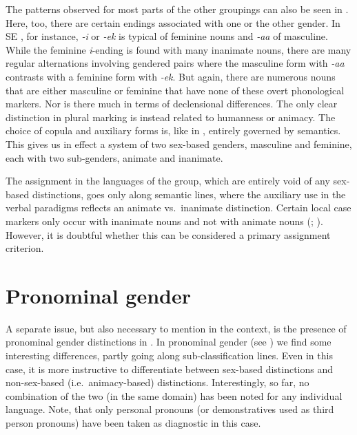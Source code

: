 \documentclass[output=collectionpaper]{langsci/langscibook}
\begin{document}
The patterns observed for most parts of the other groupings can also be seen in . Here, too, there are certain endings associated with one or the other gender. In SE , for instance, \textit{{}-i} or \textit{\nobreakdash-ek} is typical of feminine nouns and \textit{\nobreakdash-aa} of masculine. While the feminine \textit{i}{}-ending is found with many inanimate nouns, there are many regular alternations involving gendered pairs where the masculine form with \textit{\nobreakdash-aa} contrasts with a feminine form with \textit{\nobreakdash-ek}. But again, there are numerous nouns that are either masculine or feminine that have none of these overt phonological markers. Nor is there much in terms of declensional differences. The only clear distinction in plural marking is instead related to humanness or animacy. The choice of copula and auxiliary forms is, like in , entirely governed by semantics. This gives us in effect a system of two sex-based genders, masculine and feminine, each with two sub-genders, animate and inanimate.

\largerpage[-1]
The assignment in the languages of the  group, which are entirely void of any sex-based distinctions, goes only along semantic lines, where the auxiliary use in the verbal paradigms reflects an animate vs.\ inanimate distinction. Certain local case markers only occur with inanimate nouns and not with animate nouns (\citealt[53]{HeegardPetersen2006}; \citealt[844]{Bashir2003}). However, it is doubtful whether this can be considered a primary assignment criterion.

\section{Pronominal gender}
\label{sec:Lilje:7}

A separate issue, but also necessary to mention in the context, is the presence of pronominal gender distinctions in . In pronominal gender (see ) we find some interesting differences, partly going along sub-classification lines. Even in this case, it is more instructive to differentiate between sex-based distinctions and non-sex-based (i.e.\ animacy-based) distinctions. Interestingly, so far, no combination of the two (in the same domain) has been noted for any individual language. Note, that only personal pronouns (or demonstratives used as third person pronouns) have been taken as diagnostic in this case.
\end{document}
